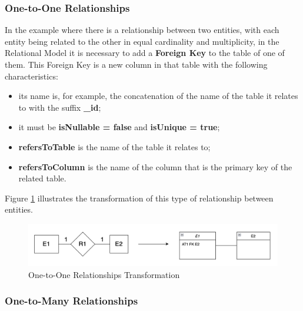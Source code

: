\documentclass[10pt]{article}
\begin{document}
\subsubsection{One-to-One Relationships}

In the example where there is a relationship between two entities, with each entity being related to the other in equal cardinality and multiplicity, in the Relational Model it is necessary to add a \textbf{Foreign Key} to the table of one of them. This Foreign Key is a new column in that table with the following characteristics:

\begin{itemize}

    \item its name is, for example, the concatenation of the name of the table it relates to with the suffix \textbf{\_id};
    
    \item it must be \textbf{isNullable = false} and \textbf{isUnique = true};
    
    \item \textbf{refersToTable} is the name of the table it relates to;
    
    \item \textbf{refersToColumn} is the name of the column that is the primary key of the related table.

\end{itemize}

Figure \ref{figure6} illustrates the transformation of this type of relationship between entities.

\begin{center}
    \begin{figure}[H]
        \centering
        \includegraphics[width=1.0\textwidth]{imgs/one-to-one-transformation.png}
            \caption{One-to-One Relationships Transformation}
        \label{figure6}
    \end{figure}
\end{center}

\subsubsection{One-to-Many Relationships}
\end{document}
